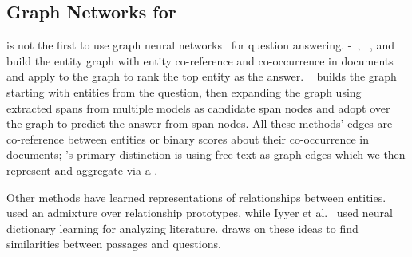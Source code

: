 \subsection{Graph Networks for }

\name{} is not the first to use graph neural networks~\cite[inter
  alia]{scarselli2009graph, kipf2016semi, schlichtkrull2017modeling}
for question answering.
%
-~\cite{de2018question},
~\cite{qiu-etal-2019-dynamically}, and
~\cite{tu-etal-2019-multi} build the entity graph with entity
co-reference and co-occurrence in documents and apply  to
the graph to rank the top entity as the answer.
%
~\cite{ding-etal-2019-cognitive} builds the
graph starting with entities from the question, then expanding the
graph using extracted spans from multiple  models as candidate
span nodes and adopt  over the graph to predict the answer
from span nodes.
%
All these methods' edges are co-reference between entities or binary
scores about their co-occurrence in documents; \name{}'s primary
distinction is using free-text as graph edges which we then represent
and aggregate via a .

Other methods have learned representations of relationships between entities.
%
~\cite{chang-09c} used an admixture over relationship
prototypes, while Iyyer et al.~\cite{iyyer-16} used neural dictionary
learning for analyzing literature.
%
\name{} draws on these ideas to find similarities between 
passages and questions.


